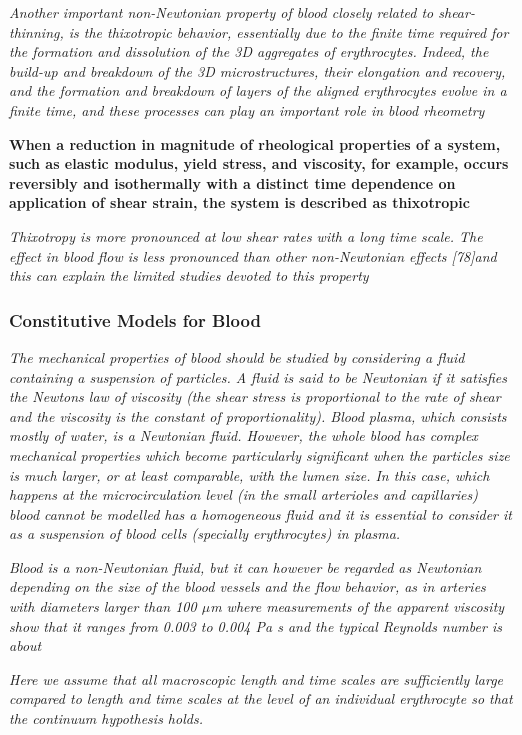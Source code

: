 \documentclass[11pt,letterpaper]{article}
\begin{document}
\textit{Another important non-Newtonian property of blood closely related to shear-thinning, is the thixotropic behavior, essentially due to the finite time required for the formation and dissolution of the 3D aggregates of erythrocytes. Indeed, the build-up and breakdown of the 3D microstructures, their elongation and recovery, and the formation and breakdown of layers of the aligned erythrocytes evolve in a finite time, and these processes can play an important role in blood rheometry}

\textbf{When a reduction in magnitude of rheological properties of a system, such as elastic modulus, yield stress, and viscosity, for example, occurs reversibly and isothermally with a distinct time dependence on application of shear strain, the system is described as thixotropic}

\textit{Thixotropy is more pronounced at low shear rates with a long time scale. The
effect in blood flow is less pronounced than other non-Newtonian effects [78]and this can explain the limited studies devoted to this property}


\subsubsection*{Constitutive Models for Blood}
\textit{The mechanical properties of blood should be studied by considering a fluid containing a suspension of particles. A fluid is said to be Newtonian if it satisfies the Newtons law of viscosity (the shear stress is proportional to the rate of shear and the viscosity is the constant of proportionality). Blood plasma, which consists mostly of water, is a Newtonian fluid. However, the whole blood has complex mechanical properties which become particularly significant when the particles size is much larger, or at least comparable, with the lumen size. In this case, which happens at the microcirculation level (in the small arterioles and capillaries) blood cannot be modelled has a homogeneous fluid and it is essential to consider it as a suspension of blood cells (specially erythrocytes) in plasma. }

\textit{
Blood is a non-Newtonian fluid, but it can however be regarded as Newtonian
depending on the size of the blood vessels and the flow behavior, as in arteries with diameters larger than 100 $\mu$m where measurements  of the apparent viscosity show
that it ranges from 0.003 to 0.004 Pa s and the typical Reynolds number is about}

\textit{
Here we assume that all macroscopic length and time scales are sufficiently large
compared to length and time scales at the level of an individual erythrocyte so that
the continuum hypothesis holds.}
\end{document}
